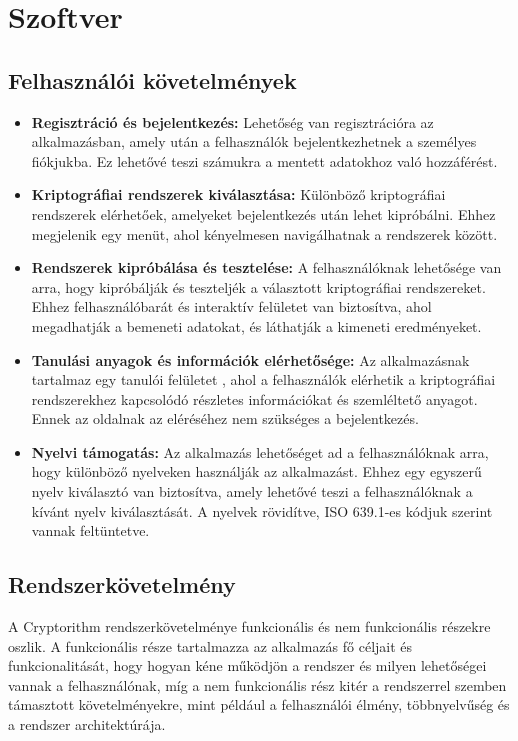 \chapter{Szoftver}

\section{Felhasználói követelmények}

\begin{itemize}
	\item\textbf{Regisztráció és bejelentkezés:} Lehetőség van regisztrációra az alkalmazásban, amely után a felhasználók bejelentkezhetnek a személyes fiókjukba. Ez lehetővé teszi számukra a mentett adatokhoz való hozzáférést.

	\item\textbf{Kriptográfiai rendszerek kiválasztása:} Különböző kriptográfiai rendszerek elérhetőek, amelyeket bejelentkezés után lehet kipróbálni. Ehhez megjelenik egy menüt, ahol kényelmesen navigálhatnak a rendszerek között.

	\item\textbf{Rendszerek kipróbálása és tesztelése:} A felhasználóknak lehetősége van arra, hogy kipróbálják és teszteljék a választott kriptográfiai rendszereket. Ehhez felhasználóbarát és interaktív felületet van biztosítva, ahol megadhatják a bemeneti adatokat, és láthatják a kimeneti eredményeket.

	\item\textbf{Tanulási anyagok és információk elérhetősége:} Az alkalmazásnak tartalmaz egy tanulói felületet , ahol a felhasználók elérhetik a kriptográfiai rendszerekhez kapcsolódó részletes információkat és szemléltető anyagot. Ennek az oldalnak az eléréséhez nem szükséges a bejelentkezés.

	\item\textbf{Nyelvi támogatás:} Az alkalmazás lehetőséget ad a felhasználóknak arra, hogy különböző nyelveken használják az alkalmazást. Ehhez egy egyszerű nyelv kiválasztó van biztosítva, amely lehetővé teszi a felhasználóknak a kívánt nyelv kiválasztását. A nyelvek rövidítve, ISO 639.1-es kódjuk szerint vannak feltüntetve.
\end{itemize}

\newpage
\section{Rendszerkövetelmény}
A Cryptorithm rendszerkövetelménye funkcionális és nem funkcionális részekre oszlik. A funkcionális része tartalmazza az alkalmazás fő céljait és funkcionalitását, hogy hogyan kéne működjön a rendszer és milyen lehetőségei vannak a felhasználónak, míg a nem funkcionális rész kitér a rendszerrel szemben támasztott követelményekre, mint például a felhasználói élmény, többnyelvűség és a rendszer architektúrája.

